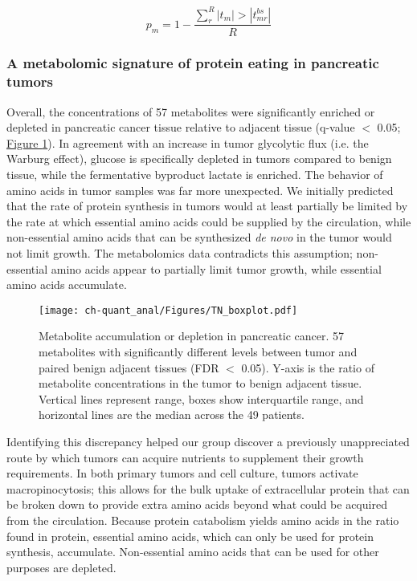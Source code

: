 \begin{equation}
p_{m} = 1 - \frac{\sum_{r}^{R}|t_{m}| > |t_{mr}^{bs}|}{R}\label{ch-quant_anal:bspval}
\end{equation}

\subsubsection{A metabolomic signature of protein eating in pancreatic tumors}

Overall, the concentrations of 57 metabolites were significantly enriched or depleted in pancreatic cancer tissue relative to adjacent tissue (q-value $<$ 0.05; \hyperref[ch-quant_anal:tnboxplot]{Figure \ref{ch-quant_anal:tnboxplot}}).  In agreement with an increase in tumor glycolytic flux (i.e. the Warburg effect), glucose is specifically depleted in tumors compared to benign tissue, while the fermentative byproduct lactate is enriched.  The behavior of amino acids in tumor samples was far more unexpected.  We initially predicted that the rate of protein synthesis in tumors would at least partially be limited by the rate at which essential amino acids could be supplied by the circulation, while non-essential amino acids that can be synthesized \textit{de novo} in the tumor would not limit growth. The metabolomics data contradicts this assumption; non-essential amino acids appear to partially limit tumor growth, while essential amino acids accumulate. 

\begin{figure}[H]
\begin{center}
\texttt{[image: ch-quant\_anal/Figures/TN\_boxplot.pdf]}
\caption[Metabolite accumulation or depletion in pancreatic cancer]{Metabolite accumulation or depletion in pancreatic cancer. 57 metabolites with significantly different levels between tumor and paired benign adjacent tissues (FDR $<$ 0.05). Y-axis is the ratio of metabolite concentrations in the tumor to benign adjacent tissue. Vertical lines represent range, boxes show interquartile range, and horizontal lines are the median across the 49 patients.}
\label{ch-quant_anal:tnboxplot}
\end{center}
\end{figure}

Identifying this discrepancy helped our group discover a previously unappreciated route by which tumors can acquire nutrients to supplement their growth requirements.  In both primary tumors and cell culture, tumors activate macropinocytosis; this allows for the bulk uptake of extracellular protein that can be broken down to provide extra amino acids beyond what could be acquired from the circulation. Because protein catabolism yields amino acids in the ratio found in protein, essential amino acids, which can only be used for protein synthesis, accumulate. Non-essential amino acids that can be used for other purposes are depleted.


